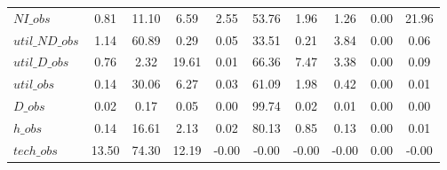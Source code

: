 \begin{center}
\begin{longtable}{lccccccccc}
$NI\_obs        $	 & 	         0.81	 & 	        11.10	 & 	         6.59	 & 	         2.55	 & 	        53.76	 & 	         1.96	 & 	         1.26	 & 	         0.00	 & 	        21.96 \\ 
$util\_ND\_obs  $	 & 	         1.14	 & 	        60.89	 & 	         0.29	 & 	         0.05	 & 	        33.51	 & 	         0.21	 & 	         3.84	 & 	         0.00	 & 	         0.06 \\ 
$util\_D\_obs   $	 & 	         0.76	 & 	         2.32	 & 	        19.61	 & 	         0.01	 & 	        66.36	 & 	         7.47	 & 	         3.38	 & 	         0.00	 & 	         0.09 \\ 
$util\_obs      $	 & 	         0.14	 & 	        30.06	 & 	         6.27	 & 	         0.03	 & 	        61.09	 & 	         1.98	 & 	         0.42	 & 	         0.00	 & 	         0.01 \\ 
$D\_obs         $	 & 	         0.02	 & 	         0.17	 & 	         0.05	 & 	         0.00	 & 	        99.74	 & 	         0.02	 & 	         0.01	 & 	         0.00	 & 	         0.00 \\ 
$h\_obs         $	 & 	         0.14	 & 	        16.61	 & 	         2.13	 & 	         0.02	 & 	        80.13	 & 	         0.85	 & 	         0.13	 & 	         0.00	 & 	         0.01 \\ 
$tech\_obs      $	 & 	        13.50	 & 	        74.30	 & 	        12.19	 & 	        -0.00	 & 	        -0.00	 & 	        -0.00	 & 	        -0.00	 & 	         0.00	 & 	        -0.00 \\ 
\end{longtable}
 \end{center}
